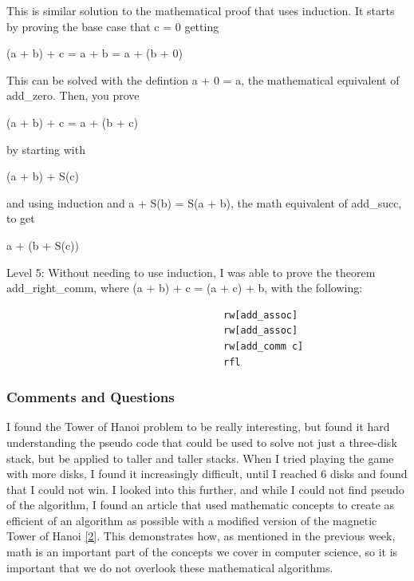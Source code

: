 \documentclass{article}
\theoremstyle{theorem}
\theoremstyle{definition}
\theoremstyle{remark}
\begin{document}
\hspace{0.65cm}This is similar solution to the mathematical proof that uses induction. It starts by proving the base case that c = 0 getting 
\begin{center}
  (a + b) + c = a + b = a + (b + 0) 
\end{center}
This can be solved with the defintion a + 0 = a, the mathematical equivalent of add\_zero. 
Then, you prove 
\begin{center}
  (a + b) + c = a + (b + c) 
\end{center}
by starting with
\begin{center}
  (a + b) + S(c) 
\end{center}
 and using induction and a + S(b) = S(a + b), the math equivalent of add\_succ, to get 
 \begin{center}
  a + (b + S(c))
 \end{center}

Level 5: Without needing to use induction, I was able to prove the theorem add\_right\_comm, where (a + b) + c = (a + c) + b, with the following:
\begin{verbatim}
                                      rw[add_assoc]
                                      rw[add_assoc]
                                      rw[add_comm c]
                                      rfl
\end{verbatim}

\subsubsection{Comments and Questions}

I found the Tower of Hanoi problem to be really interesting, but found it hard understanding the pseudo code that could be used 
to solve not just a three-disk stack, but be applied to taller and taller stacks. When I tried playing the game with more disks, I found it increasingly difficult, 
until I reached 6 disks and found that I could not win.
\hspace{0.65cm}I looked into this further, and while I could not find pseudo of the algorithm, I found an article that used mathematic concepts to create as efficient of an algorithm as 
possible with a modified version of the magnetic Tower of Hanoi \hyperref[2]{[2]}. This demonstrates how, as mentioned in the previous week, 
math is an important part of the concepts we cover in computer science, so it is important that we do not overlook these mathematical algorithms.
\end{document}
